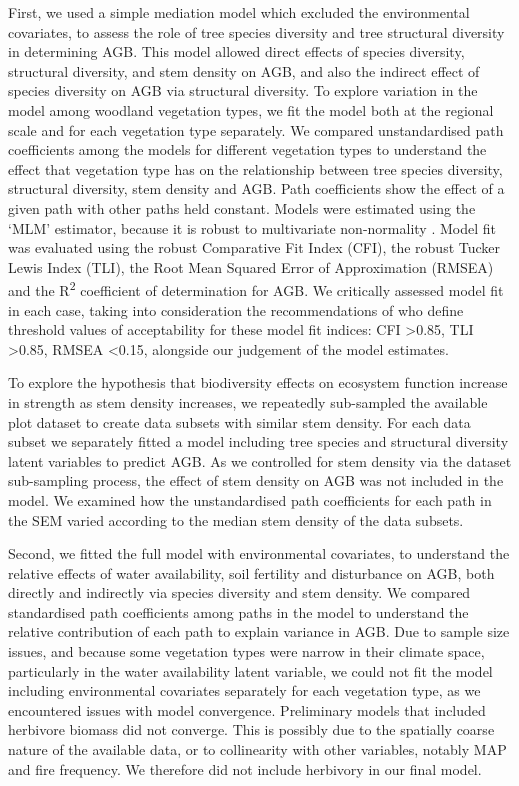 \begin{refsection}
First, we used a simple mediation model which excluded the environmental covariates, to assess the role of tree species diversity and tree structural diversity in determining AGB. This model allowed direct effects of species diversity, structural diversity, and stem density on AGB, and also the indirect effect of species diversity on AGB via structural diversity. To explore variation in the model among woodland vegetation types, we fit the model both at the regional scale and for each vegetation type separately. We compared unstandardised path coefficients among the models for different vegetation types to understand the effect that vegetation type has on the relationship between tree species diversity, structural diversity, stem density and AGB. Path coefficients show the effect of a given path with other paths held constant. Models were estimated using the `MLM' estimator, because it is robust to multivariate non-normality \citep{Shapiro1983}. Model fit was evaluated using the robust Comparative Fit Index (CFI), the robust Tucker Lewis Index (TLI), the Root Mean Squared Error of Approximation (RMSEA) and the R\textsuperscript{2} coefficient of determination for AGB. We critically assessed model fit in each case, taking into consideration the recommendations of \citet{Hu1999} who define threshold values of acceptability for these model fit indices: CFI >0.85, TLI >0.85, RMSEA <0.15, alongside our judgement of the model estimates.

To explore the hypothesis that biodiversity effects on ecosystem function increase in strength as stem density increases, we repeatedly sub-sampled the available plot dataset to create \subn{} data subsets with similar stem density. For each data subset we separately fitted a model including tree species and structural diversity latent variables to predict AGB. As we controlled for stem density via the dataset sub-sampling process, the effect of stem density on AGB was not included in the model. We examined how the unstandardised path coefficients for each path in the SEM varied according to the median stem density of the data subsets. 

Second, we fitted the full model with environmental covariates, to understand the relative effects of water availability, soil fertility and disturbance on AGB, both directly and indirectly via species diversity and stem density. We compared standardised path coefficients among paths in the model to understand the relative contribution of each path to explain variance in AGB. Due to sample size issues, and because some vegetation types were narrow in their climate space, particularly in the water availability latent variable, we could not fit the model including environmental covariates separately for each vegetation type, as we encountered issues with model convergence. Preliminary models that included herbivore biomass \citep{Hempson2017} did not converge. This is possibly due to the spatially coarse nature of the available data, or to collinearity with other variables, notably MAP and fire frequency. We therefore did not include herbivory in our final model.


\end{refsection}
